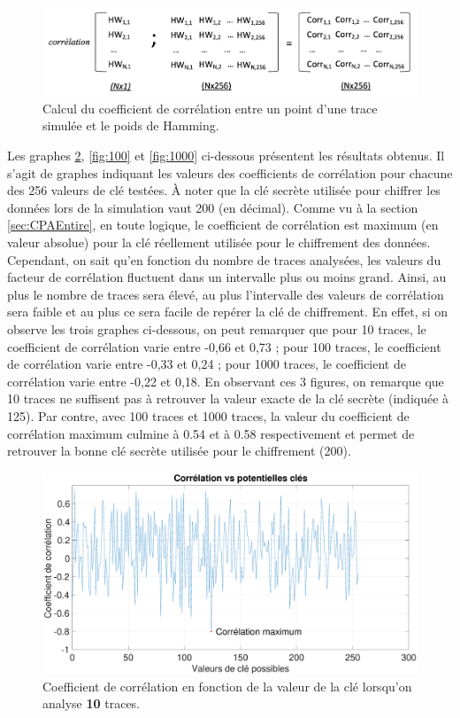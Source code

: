 \documentclass[oneside]{book}
\begin{document}
\begin{figure}[htbp]
    \centering
    \includegraphics[scale=0.35]{image/CorrEx1}
    \caption{Calcul du coefficient de corrélation entre un point d'une trace simulée et le poids de Hamming.}
    \label{fig:CorrEx1} 
\end{figure}

\newpage

Les graphes \ref{fig:10}, \ref{fig:100} et \ref{fig:1000} ci-dessous présentent les résultats obtenus. Il s'agit de graphes indiquant les valeurs des coefficients de corrélation pour chacune des 256 valeurs de clé testées. À noter que la clé secrète utilisée pour chiffrer les données lors de la simulation vaut 200 (en décimal). Comme vu à la section \ref{sec:CPAEntire}, en toute logique, le coefficient de corrélation est maximum (en valeur absolue) pour la clé réellement utilisée pour le chiffrement des données. Cependant, on sait qu'en fonction du nombre de traces analysées, les valeurs du facteur de corrélation fluctuent dans un intervalle plus ou moins grand. Ainsi, au plus le nombre de traces sera élevé, au plus l'intervalle des valeurs de corrélation sera faible et au plus ce sera facile de repérer la clé de chiffrement. En effet, si on observe les trois graphes ci-dessous, on peut remarquer que pour 10 traces, le coefficient de corrélation varie entre -0,66 et 0,73 ; pour 100 traces, le coefficient de corrélation varie entre -0,33 et 0,24 ; pour 1000 traces, le coefficient de corrélation varie entre -0,22 et 0,18. En observant ces 3 figures, on remarque que 10 traces ne suffisent pas à retrouver la valeur exacte de la clé secrète (indiquée à 125). Par contre, avec 100 traces et 1000 traces, la valeur du coefficient de corrélation maximum culmine à 0.54 et à 0.58 respectivement et permet de retrouver la bonne clé secrète utilisée pour le chiffrement (200).

\begin{figure}[htbp]
    \centering
    \hspace{-1.2 cm}
    \includegraphics[scale=0.25]{image/10.eps}    \caption{Coefficient de corrélation en fonction de la valeur de la clé lorsqu'on analyse \textbf{10} traces.}    \label{fig:10}
\end{figure}
\end{document}
